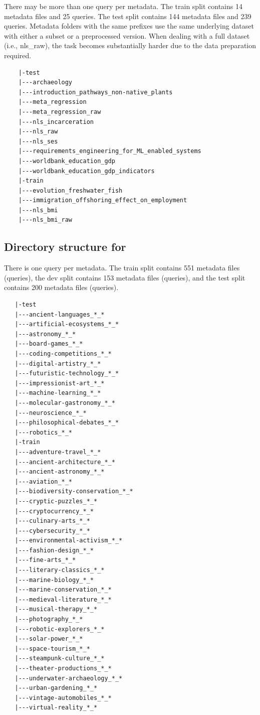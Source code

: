 There may be more than one query per metadata. The train split contains 14 metadata files and 25 queries. The test split contains 144 metadata files and 239 queries. Metadata folders with the same prefixes use the same underlying dataset with either a subset or a preprocessed version. When dealing with a full dataset (i.e., nls\_raw), the task becomes substantially harder due to the data preparation required.

\begin{verbatim}
    |-test
    |---archaeology
    |---introduction_pathways_non-native_plants
    |---meta_regression
    |---meta_regression_raw
    |---nls_incarceration
    |---nls_raw
    |---nls_ses
    |---requirements_engineering_for_ML_enabled_systems
    |---worldbank_education_gdp
    |---worldbank_education_gdp_indicators
    |-train
    |---evolution_freshwater_fish
    |---immigration_offshoring_effect_on_employment
    |---nls_bmi
    |---nls_bmi_raw
\end{verbatim}

\subsection{Directory structure for \synth{}}


There is one query per metadata. The train split contains 551 metadata files (queries), the dev split contains 153 metadata files (queries), and the test split contains 200 metadata files (queries).

\begin{verbatim}
   |-test
   |---ancient-languages_*_*
   |---artificial-ecosystems_*_*
   |---astronomy_*_*
   |---board-games_*_*
   |---coding-competitions_*_*
   |---digital-artistry_*_*
   |---futuristic-technology_*_*
   |---impressionist-art_*_*
   |---machine-learning_*_*
   |---molecular-gastronomy_*_*
   |---neuroscience_*_*
   |---philosophical-debates_*_*
   |---robotics_*_*
   |-train
   |---adventure-travel_*_*
   |---ancient-architecture_*_*
   |---ancient-astronomy_*_*
   |---aviation_*_*
   |---biodiversity-conservation_*_*
   |---cryptic-puzzles_*_*
   |---cryptocurrency_*_*
   |---culinary-arts_*_*
   |---cybersecurity_*_*
   |---environmental-activism_*_*
   |---fashion-design_*_*
   |---fine-arts_*_*
   |---literary-classics_*_*
   |---marine-biology_*_*
   |---marine-conservation_*_*
   |---medieval-literature_*_*
   |---musical-therapy_*_*
   |---photography_*_*
   |---robotic-explorers_*_*
   |---solar-power_*_*
   |---space-tourism_*_*
   |---steampunk-culture_*_*
   |---theater-productions_*_*
   |---underwater-archaeology_*_*
   |---urban-gardening_*_*
   |---vintage-automobiles_*_*
   |---virtual-reality_*_*

\end{verbatim}

